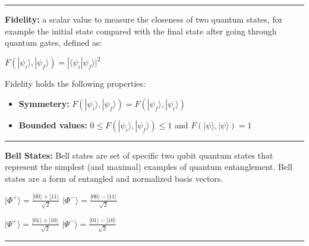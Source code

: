 \documentclass{article}
\begin{document}
 
\vspace{5pt}
\hrule 
\vspace{5pt}


\textbf{Fidelity:} a scalar value to measure the closeness of two quantum states, for example the initial state compared with the final state after going through quantum gates, defined as:

\begin{center}

$ F(|\psi_{i}\rangle, |\psi_{f}\rangle) = | \langle \psi_{i} | \psi_{f}\rangle | ^2 $ 

\end{center}

Fidelity holds the following properties:

\begin{itemize}
	\item \textbf{Symmetery:}  $ F(|\psi_{i}\rangle, |\psi_{f}\rangle) = F( |\psi_{f}\rangle, |\psi_{i}\rangle ) $
	\item \textbf{Bounded values:}  $ 0 \le F(|\psi_{i}\rangle, |\psi_{f}\rangle) \le 1$ and $ F(|\psi\rangle,|\psi\rangle) = 1 $
\end{itemize}

\vspace{5pt}
\hrule 
\vspace{5pt}


\newpage

\textbf{Bell States:}
Bell states are set of specific two qubit quantum states that represent the simplest (and maximal) examples of quantum entanglement. Bell states are a form of entangled and normalized basis vectors.

\begin{center}
$|\Phi^+\rangle = \frac{|00\rangle + |11\rangle}{\sqrt{2}}$
\quad
$|\Phi^-\rangle = \frac{|00\rangle - |11\rangle}{\sqrt{2}}$

\quad

$|\Psi^+\rangle = \frac{|01\rangle + |10\rangle}{\sqrt{2}}$
\quad
$|\Psi^-\rangle = \frac{|01\rangle - |10\rangle}{\sqrt{2}}$

\end{center}


\vspace{5pt}

\hrule
\vspace{5pt}
\end{document}
